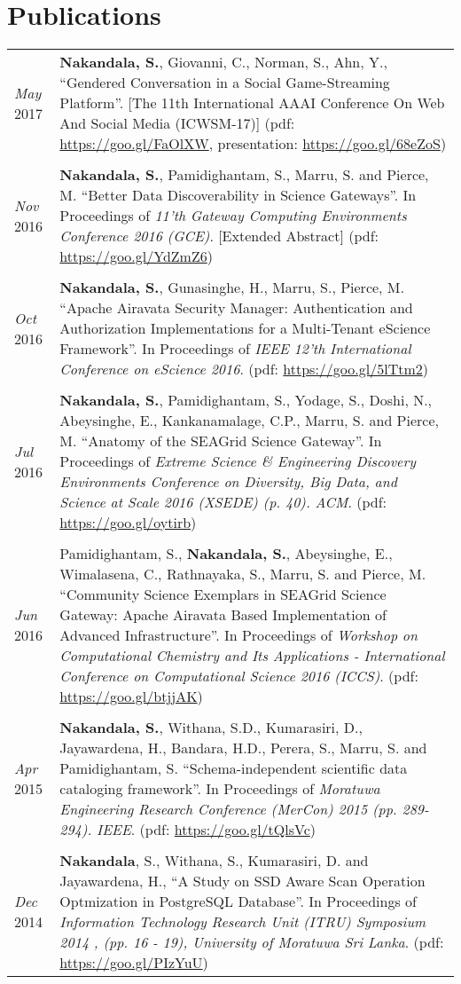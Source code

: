 \documentclass[a4paper,10pt]{article}
\begin{document}
\section{Publications}

\begin{tabular}{p{3cm}p{13.5cm}}

\emph{May} 2017 & \textbf{Nakandala, S.}, Giovanni, C., Norman, S., Ahn, Y., ``Gendered Conversation in a Social Game-Streaming Platform''. [The 11th International AAAI Conference On Web And Social Media (ICWSM-17)] (pdf: \url{https://goo.gl/FaOlXW}, presentation: \url{https://goo.gl/68eZoS})
\\\\
\emph{Nov} 2016 & \textbf{Nakandala, S.}, Pamidighantam, S., Marru, S. and Pierce, M. ``Better Data Discoverability in Science Gateways''. In Proceedings of \textit{11'th Gateway Computing Environments Conference 2016 (GCE)}. [Extended Abstract] (pdf: \url{https://goo.gl/YdZmZ6})
\\\\
\emph{Oct} 2016 & \textbf{Nakandala, S.}, Gunasinghe, H., Marru, S., Pierce, M. ``Apache Airavata Security Manager: Authentication and Authorization Implementations for a Multi-Tenant eScience Framework''. In Proceedings of \textit{IEEE 12'th International Conference on eScience 2016}. (pdf: \url{https://goo.gl/5lTtm2})
\\\\
\emph{Jul} 2016 & \textbf{Nakandala, S.}, Pamidighantam, S., Yodage, S., Doshi, N., Abeysinghe, E., Kankanamalage, C.P., Marru, S. and Pierce, M. ``Anatomy of the SEAGrid Science Gateway''. In Proceedings of \textit{Extreme Science \& Engineering Discovery Environments Conference on Diversity, Big Data, and Science at Scale 2016 (XSEDE) (p. 40). ACM}. (pdf: \url{https://goo.gl/oytirb})
\\\\
\emph{Jun} 2016 & Pamidighantam, S., \textbf{Nakandala, S.}, Abeysinghe, E., Wimalasena, C., Rathnayaka, S., Marru, S. and Pierce, M. ``Community Science Exemplars in SEAGrid Science Gateway: Apache Airavata Based Implementation of Advanced Infrastructure''. In Proceedings of \textit{Workshop on Computational Chemistry and Its Applications - International Conference on Computational Science 2016 (ICCS)}. (pdf: \url{https://goo.gl/btjjAK})
\\\\
\emph{Apr} 2015 & \textbf{Nakandala, S.}, Withana, S.D., Kumarasiri, D., Jayawardena, H., Bandara, H.D., Perera, S., Marru, S. and Pamidighantam, S. ``Schema-independent scientific data cataloging framework''. In Proceedings of \textit{Moratuwa Engineering Research Conference (MerCon) 2015 (pp. 289-294). IEEE}. (pdf: \url{https://goo.gl/tQlsVc})
\\\\
\emph{Dec} 2014 & \textbf{Nakandala}, S., Withana, S., Kumarasiri, D. and Jayawardena, H., ``A Study on SSD Aware Scan Operation Optmization in PostgreSQL Database''. In Proceedings of \textit{Information Technology Research Unit (ITRU) Symposium 2014 , (pp. 16 - 19), University of Moratuwa Sri Lanka}. (pdf: \url{https://goo.gl/PIzYuU})
\end{tabular}
\end{document}
